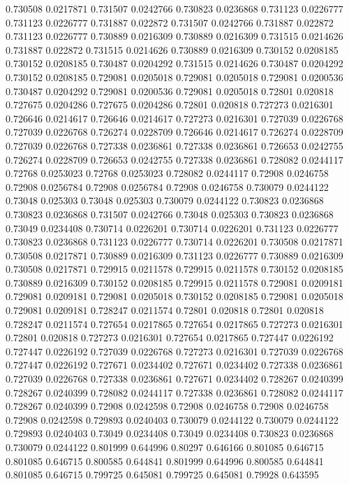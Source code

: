 0.730508 0.0217871
0.731507 0.0242766
0.730823 0.0236868
0.731123 0.0226777
0.731123 0.0226777
0.731887 0.022872
0.731507 0.0242766
0.731887 0.022872
0.731123 0.0226777
0.730889 0.0216309
0.730889 0.0216309
0.731515 0.0214626
0.731887 0.022872
0.731515 0.0214626
0.730889 0.0216309
0.730152 0.0208185
0.730152 0.0208185
0.730487 0.0204292
0.731515 0.0214626
0.730487 0.0204292
0.730152 0.0208185
0.729081 0.0205018
0.729081 0.0205018
0.729081 0.0200536
0.730487 0.0204292
0.729081 0.0200536
0.729081 0.0205018
0.72801 0.020818
0.727675 0.0204286
0.727675 0.0204286
0.72801 0.020818
0.727273 0.0216301
0.726646 0.0214617
0.726646 0.0214617
0.727273 0.0216301
0.727039 0.0226768
0.727039 0.0226768
0.726274 0.0228709
0.726646 0.0214617
0.726274 0.0228709
0.727039 0.0226768
0.727338 0.0236861
0.727338 0.0236861
0.726653 0.0242755
0.726274 0.0228709
0.726653 0.0242755
0.727338 0.0236861
0.728082 0.0244117
0.72768 0.0253023
0.72768 0.0253023
0.728082 0.0244117
0.72908 0.0246758
0.72908 0.0256784
0.72908 0.0256784
0.72908 0.0246758
0.730079 0.0244122
0.73048 0.025303
0.73048 0.025303
0.730079 0.0244122
0.730823 0.0236868
0.730823 0.0236868
0.731507 0.0242766
0.73048 0.025303
0.730823 0.0236868
0.73049 0.0234408
0.730714 0.0226201
0.730714 0.0226201
0.731123 0.0226777
0.730823 0.0236868
0.731123 0.0226777
0.730714 0.0226201
0.730508 0.0217871
0.730508 0.0217871
0.730889 0.0216309
0.731123 0.0226777
0.730889 0.0216309
0.730508 0.0217871
0.729915 0.0211578
0.729915 0.0211578
0.730152 0.0208185
0.730889 0.0216309
0.730152 0.0208185
0.729915 0.0211578
0.729081 0.0209181
0.729081 0.0209181
0.729081 0.0205018
0.730152 0.0208185
0.729081 0.0205018
0.729081 0.0209181
0.728247 0.0211574
0.72801 0.020818
0.72801 0.020818
0.728247 0.0211574
0.727654 0.0217865
0.727654 0.0217865
0.727273 0.0216301
0.72801 0.020818
0.727273 0.0216301
0.727654 0.0217865
0.727447 0.0226192
0.727447 0.0226192
0.727039 0.0226768
0.727273 0.0216301
0.727039 0.0226768
0.727447 0.0226192
0.727671 0.0234402
0.727671 0.0234402
0.727338 0.0236861
0.727039 0.0226768
0.727338 0.0236861
0.727671 0.0234402
0.728267 0.0240399
0.728267 0.0240399
0.728082 0.0244117
0.727338 0.0236861
0.728082 0.0244117
0.728267 0.0240399
0.72908 0.0242598
0.72908 0.0246758
0.72908 0.0246758
0.72908 0.0242598
0.729893 0.0240403
0.730079 0.0244122
0.730079 0.0244122
0.729893 0.0240403
0.73049 0.0234408
0.73049 0.0234408
0.730823 0.0236868
0.730079 0.0244122
0.801999 0.644996
0.80297 0.646166
0.801085 0.646715
0.801085 0.646715
0.800585 0.644841
0.801999 0.644996
0.800585 0.644841
0.801085 0.646715
0.799725 0.645081
0.799725 0.645081
0.79928 0.643595
